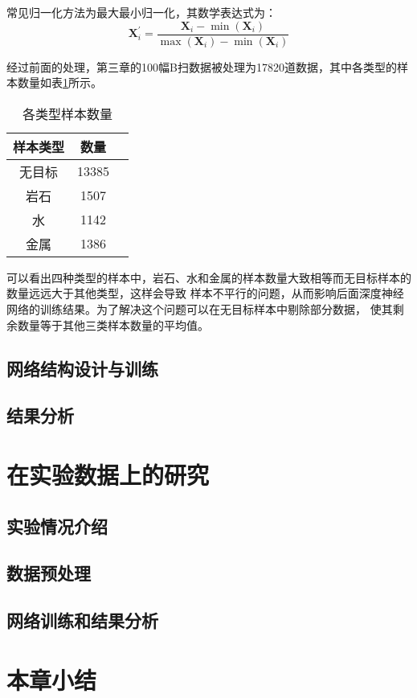 常见归一化方法为最大最小归一化，其数学表达式为：
\begin{equation}
	\mathbf{X}_i^{\prime}=\frac{\mathbf{X}_i-\min (\mathbf{X}_i)}
	{\max (\mathbf{X}_i)-\min (\mathbf{X}_i)}
\end{equation}

经过前面的处理，第三章的100幅B扫数据被处理为17820道数据，其中各类型的样本数量如表\ref{table_sample_kind_unbalanced}所示。
\begin{table}[h]
	\caption{各类型样本数量} 
	\begin{tabular}{|c|c|c|} 
		\hline  
		样本类型 &  数量\\
		\hline 
		无目标 & 13385 \\  
		\hline  
		岩石 & 1507 \\  
		\hline  
		水 & 1142\\
		\hline
		金属 & 1386 \\
		\hline  
	\end{tabular}
	\label{table_sample_kind_unbalanced}
\end{table}

可以看出四种类型的样本中，岩石、水和金属的样本数量大致相等而无目标样本的数量远远大于其他类型，这样会导致
样本不平行的问题，从而影响后面深度神经网络的训练结果。为了解决这个问题可以在无目标样本中剔除部分数据，
使其剩余数量等于其他三类样本数量的平均值。

\subsection{网络结构设计与训练}
\subsection{结果分析}
\section{在实验数据上的研究}
\subsection{实验情况介绍}
\subsection{数据预处理}
\subsection{网络训练和结果分析}
\section{本章小结}
